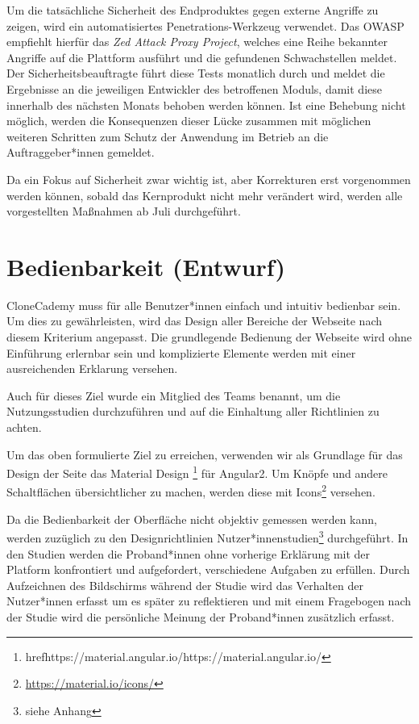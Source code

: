 \documentclass[accentcolor=tud0b,12pt,paper=a4]{tudreport}
\begin{document}
Um die tatsächliche Sicherheit des Endproduktes gegen externe Angriffe zu zeigen, wird ein automatisiertes Penetrations-Werkzeug verwendet. Das OWASP empfiehlt hierfür das \emph{Zed Attack Proxy Project}, welches eine Reihe bekannter Angriffe auf die Plattform ausführt und die gefundenen Schwachstellen meldet. Der Sicherheitsbeauftragte führt diese Tests monatlich durch und meldet die Ergebnisse an die jeweiligen Entwickler des betroffenen Moduls, damit diese innerhalb des nächsten Monats behoben werden können. Ist eine Behebung nicht möglich, werden die Konsequenzen dieser Lücke zusammen mit möglichen weiteren Schritten zum Schutz der Anwendung im Betrieb an die Auftraggeber*innen gemeldet.

Da ein Fokus auf Sicherheit zwar wichtig ist, aber Korrekturen erst vorgenommen werden können, sobald das Kernprodukt nicht mehr verändert wird, werden alle vorgestellten Maßnahmen ab Juli durchgeführt.

\section{Bedienbarkeit (Entwurf)}
CloneCademy muss für alle Benutzer*innen einfach und intuitiv bedienbar sein. Um dies zu gewährleisten, wird das Design aller Bereiche der Webseite nach diesem Kriterium angepasst. Die grundlegende Bedienung der Webseite wird ohne Einführung erlernbar sein und komplizierte Elemente werden mit einer ausreichenden Erklarung versehen.

Auch für dieses Ziel wurde ein Mitglied des Teams benannt, um die Nutzungsstudien durchzuführen und auf die Einhaltung aller Richtlinien zu achten.

Um das oben formulierte Ziel zu erreichen, verwenden wir als Grundlage für das Design der Seite das Material Design \footnote{href{https://material.angular.io/}{https://material.angular.io/}} für Angular2. Um Knöpfe und andere Schaltflächen übersichtlicher zu machen, werden diese mit Icons\footnote{\href{https://material.io/icons/}{https://material.io/icons/}} versehen.

Da die Bedienbarkeit der Oberfläche nicht objektiv gemessen werden kann, werden zuzüglich zu den Designrichtlinien Nutzer*innenstudien\footnote{siehe Anhang} durchgeführt. In den Studien werden die Proband*innen ohne vorherige Erklärung mit der Platform konfrontiert und aufgefordert, verschiedene Aufgaben zu erfüllen. Durch Aufzeichnen des Bildschirms während der Studie wird das Verhalten der Nutzer*innen erfasst um es später zu reflektieren und mit einem Fragebogen nach der Studie wird die persönliche Meinung der Proband*innen zusätzlich erfasst.
\end{document}
